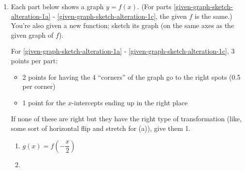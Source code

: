 \documentclass{article}
\begin{document}
\begin{enumerate}
\item \label{given-graph-sketch-alteration-1} 

  Each part below shows a graph $y = f(x)$. (For parts \ref{given-graph-sketch-alteration-1a} - \ref{given-graph-sketch-alteration-1c}, the given $f$ is the same.) You're also given a new function; sketch its graph (on the same axes as the given graph of $f$).

  \begin{grading}
    For \ref{given-graph-sketch-alteration-1a} - \ref{given-graph-sketch-alteration-1c}, 3 points per part:
    \begin{itemize}[nosep]
    \item 2 points for having the 4 ``corners'' of the graph go to the right spots (0.5 per corner)
    \item 1 point for the $x$-intercepts ending up in the right place
    \end{itemize}
    If none of these are right but they have the right type of transformation (like, some sort of horizontal flip and stretch for (a)), give them 1.
  \end{grading}

  \begin{enumerate}

  \item \label{given-graph-sketch-alteration-1a}

    \begin{problem}
      $g(x) = f \left( - \dfrac{x}{2} \right)$
    \end{problem}


  \item


\end{enumerate}
\end{enumerate}
\end{document}
